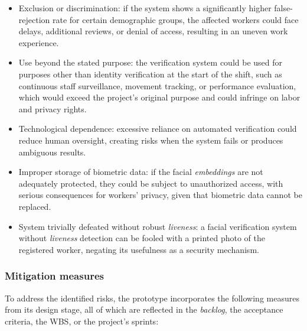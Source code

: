\documentclass[
  11pt, %
]{charter}
\begin{document}
\begin{itemize}
  \item Exclusion or discrimination: if the system shows a significantly higher false-rejection rate for certain demographic groups, the affected workers could face delays, additional reviews, or denial of access, resulting in an uneven work experience.
  \item Use beyond the stated purpose: the verification system could be used for purposes other than identity verification at the start of the shift, such as continuous staff surveillance, movement tracking, or performance evaluation, which would exceed the project's original purpose and could infringe on labor and privacy rights.
  \item Technological dependence: excessive reliance on automated verification could reduce human oversight, creating risks when the system fails or produces ambiguous results.
  \item Improper storage of biometric data: if the facial \textit{embeddings} are not adequately protected, they could be subject to unauthorized access, with serious consequences for workers' privacy, given that biometric data cannot be replaced.
  \item System trivially defeated without robust \textit{liveness}: a facial verification system without \textit{liveness} detection can be fooled with a printed photo of the registered worker, negating its usefulness as a security mechanism.
\end{itemize}

\subsubsection{Mitigation measures}

To address the identified risks, the prototype incorporates the following measures from its design stage, all of which are reflected in the \textit{backlog}, the acceptance criteria, the WBS, or the project's sprints:
\end{document}
